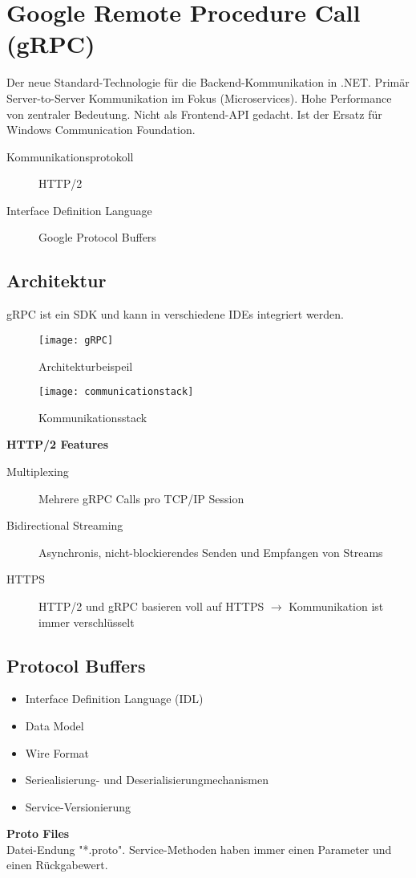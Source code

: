 \section{Google Remote Procedure Call (gRPC)}
Der neue Standard-Technologie für die Backend-Kommunikation in .NET. Primär Server-to-Server Kommunikation im Fokus (Microservices). Hohe Performance von zentraler Bedeutung. Nicht als Frontend-API gedacht. Ist der Ersatz für Windows Communication Foundation.

\begin{description}
  \item[Kommunikationsprotokoll] HTTP/2
  \item[Interface Definition Language] Google Protocol Buffers
\end{description}

\subsection{Architektur}
gRPC ist ein SDK und kann in verschiedene IDEs integriert werden. 

\begin{figure}[h!]
	\centering
	\texttt{[image: gRPC]}
 	\caption{Architekturbeispeil}
\end{figure}

\begin{figure}[h!]
  	\centering
  	\texttt{[image: communicationstack]}
  \caption{Kommunikationsstack}
\end{figure}

\textbf{HTTP/2 Features}
\begin{description}
  \item[Multiplexing] Mehrere gRPC Calls pro TCP/IP Session
  \item[Bidirectional Streaming] Asynchronis, nicht-blockierendes Senden und Empfangen von Streams
  \item[HTTPS] HTTP/2 und gRPC basieren voll auf HTTPS $\rightarrow$ Kommunikation ist immer verschlüsselt
\end{description}

\subsection{Protocol Buffers}
\begin{itemize}
  \itemsep -0.5em 
  \item Interface Definition Language (IDL)
  \item Data Model
  \item Wire Format
  \item Seriealisierung- und Deserialisierungmechanismen
  \item Service-Versionierung
\end{itemize}

\textbf{Proto Files} \\
Datei-Endung "*.proto". Service-Methoden haben immer einen Parameter und einen Rückgabewert. 









